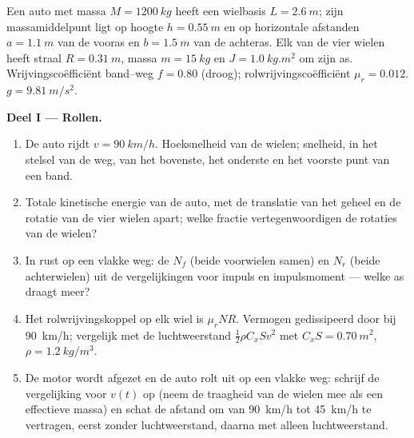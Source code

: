 \begin{problem}
\label{pb:b2:rigid-body-mechanics:1}

Een auto met massa $M = \qty{1200}{kg}$ heeft een wielbasis $L = \qty{2.6}{m}$;
zijn massamiddelpunt ligt op hoogte $h = \qty{0.55}{m}$ en op horizontale
afstanden $a = \qty{1.1}{m}$ van de vooras en $b = \qty{1.5}{m}$ van de
achteras. Elk van de vier wielen heeft straal $R = \qty{0.31}{m}$, massa
$m =
\qty{15}{kg}$ en  $J = \qty{1.0}{kg.m^2}$ om zijn as.
Wrijvingscoëfficiënt band--weg $f = 0.80$ (droog); rolwrijvingscoëfficiënt
$\mu_r = 0.012$. $g = \qty{9.81}{m/s^2}$.

\medskip
\noindent\textbf{Deel I --- Rollen.}
\begin{enumerate}
  \item De auto rijdt $v = \qty{90}{km/h}$. Hoeksnelheid van de wielen;
        snelheid, in het stelsel van de weg, van het bovenste, het
        onderste en het voorste punt van een band.
  \item Totale kinetische energie van de auto, met de translatie van het
        geheel en de rotatie van de vier wielen apart; welke fractie
        vertegenwoordigen de rotaties van de wielen?
  \item In rust op een vlakke weg: de  $N_f$ (beide
        voorwielen samen) en $N_r$ (beide achterwielen) uit de
        vergelijkingen voor impuls en impulsmoment --- welke as draagt
        meer?
  \item Het rolwrijvingskoppel op elk wiel is $\mu_rNR$. Vermogen
        gedissipeerd door  bij \qty{90}{km/h}; vergelijk met de
        luchtweerstand $\tfrac12\rho C_xSv^2$ met
        $C_xS =
        \qty{0.70}{m^2}$, $\rho = \qty{1.2}{kg/m^3}$.
  \item De motor wordt afgezet en de auto rolt uit op een vlakke weg:
        schrijf de vergelijking voor $v(t)$ op (neem de traagheid van de
        wielen mee als een effectieve massa) en schat de afstand om van
        \qty{90}{km/h} tot \qty{45}{km/h} te vertragen, eerst zonder
        luchtweerstand, daarna met alleen luchtweerstand.
\end{enumerate}


\end{problem}
